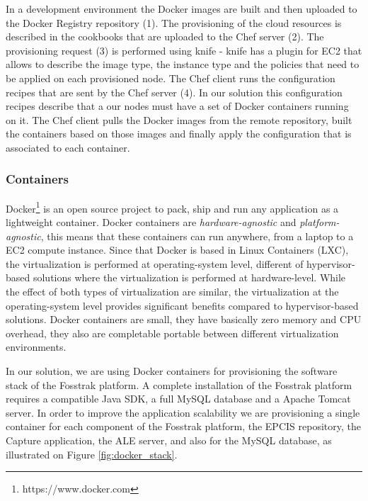 In a development environment the Docker images are built and then uploaded to the Docker Registry
repository (1). The provisioning of the cloud resources is described in the cookbooks that are uploaded
to the Chef server (2). The provisioning request (3) is performed using knife - knife has a plugin for EC2
that allows to describe the image type, the instance type and the policies that need to be applied on
each provisioned node. The Chef client runs the configuration recipes that are sent by the Chef server (4).
In our solution this configuration recipes describe that a our nodes must have a set of Docker containers
running on it. The Chef client pulls the Docker images from the remote repository, built the
containers based on those images and finally apply the configuration that is associated to each container.

\subsubsection{Containers}
\label{subs:containers}
Docker\footnote{https://www.docker.com} is an open source project to pack, ship and run any application
as a lightweight container. Docker containers are \textit{hardware-agnostic} and \textit{platform-agnostic},
this means that these containers can run anywhere, from a laptop to a EC2 compute instance. Since that Docker
is based in Linux Containers (LXC), the virtualization is performed at operating-system level, different of
hypervisor-based solutions where the virtualization is performed at hardware-level. While the effect of both
types of virtualization are similar, the virtualization at the operating-system level provides significant
benefits compared to hypervisor-based solutions. Docker containers are small, they have basically zero
memory and CPU overhead, they also are completable portable between different virtualization environments.

In our solution, we are using Docker containers for provisioning the software stack of the Fosstrak platform.
A complete installation of the Fosstrak platform requires a compatible Java SDK, a full MySQL database and
a Apache Tomcat server. In order to improve the application scalability we are provisioning a single container
for each component of the Fosstrak platform, the EPCIS repository, the Capture application, the ALE server,
and also for the MySQL database, as illustrated on Figure \ref{fig:docker_stack}.

